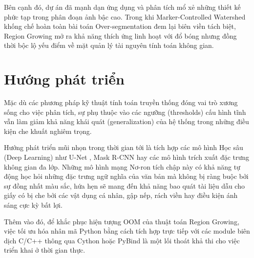 \documentclass[12pt, a4paper]{report}
\begin{document}
Bên cạnh đó, dự án đã mạnh dạn ứng dụng và phân tích mổ xẻ những thiết kế phức tạp trong phân đoạn ảnh bậc cao. Trong khi Marker-Controlled Watershed khống chế hoàn toàn bài toán Over-segmentation đem lại biên viền tách biệt, Region Growing mở ra khả năng thích ứng linh hoạt với đổ bóng nhưng đồng thời bộc lộ yếu điểm về mặt quản lý tài nguyên tính toán không gian.
 
\section{Hướng phát triển}

Mặc dù các phương pháp kỹ thuật tính toán truyền thống đóng vai trò xương sống cho việc phân tích, sự phụ thuộc vào các ngưỡng (thresholds) cấu hình tĩnh vẫn làm giảm khả năng khái quát (generalization) của hệ thống trong những điều kiện che khuất nghiêm trọng. 

Hướng phát triển mũi nhọn trong thời gian tới là tích hợp các mô hình Học sâu (Deep Learning) như U-Net \cite{unet2015}, Mask R-CNN \cite{maskrcnn2017} hay các mô hình trích xuất đặc trưng không gian đa lớp. Những mô hình mạng Nơ-ron tích chập này có khả năng tự động học hỏi những đặc trưng ngữ nghĩa của văn bản mà không bị ràng buộc bởi sự đồng nhất màu sắc, hứa hẹn sẽ mang đến khả năng bao quát tài liệu dẫu cho giấy có bị che bởi các vật dụng cá nhân, gập nếp, rách viền hay điều kiện ánh sáng cực kỳ bất lợi. 

Thêm vào đó, để khắc phục hiện tượng OOM của thuật toán Region Growing, việc tối ưu hóa nhân mã Python bằng cách tích hợp trực tiếp với các module biên dịch C/C++ thông qua Cython \cite{cython_docs} hoặc PyBind là một lối thoát khả thi cho việc triển khai ở thời gian thực.
\end{document}
